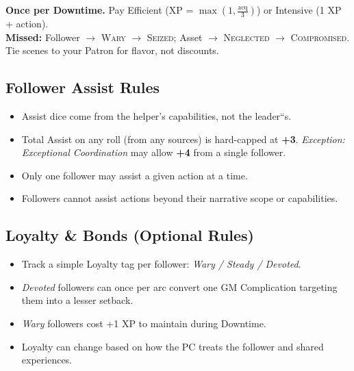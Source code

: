 \begin{tcolorbox}[title={Upkeep Quick Reference},colback=gray!5,colframe=black,breakable]
\textbf{Once per Downtime.} Pay Efficient (XP = \(\max(1, \frac{\text{acq}}{3})\)) or Intensive (1 XP + action). \\
\textbf{Missed:} Follower \(\to\) \textsc{Wary} \(\to\) \textsc{Seized}; Asset \(\to\) \textsc{Neglected} \(\to\) \textsc{Compromised}. \\
Tie scenes to your Patron for flavor, not discounts.
\end{tcolorbox}

\subsection{Follower Assist Rules}\label{subsec:follower_assist}

\begin{itemize}
    \item Assist dice come from the helper's capabilities, not the leader``s.
    \item Total Assist on any roll (from any sources) is hard-capped at \textbf{+3}. \emph{Exception:} \textit{Exceptional Coordination} may allow \textbf{+4} from a single follower.
    \item Only one follower may assist a given action at a time.
    \item Followers cannot assist actions beyond their narrative scope or capabilities.
\end{itemize}

\subsection{Loyalty \& Bonds (Optional Rules)}\label{subsec:follower_loyalty}

\begin{itemize}
    \item Track a simple Loyalty tag per follower: \emph{Wary / Steady / Devoted}.
    \item \emph{Devoted} followers can once per arc convert one GM Complication targeting them into a lesser setback.
    \item \emph{Wary} followers cost +1 XP to maintain during Downtime.
    \item Loyalty can change based on how the PC treats the follower and shared experiences.
\end{itemize}

